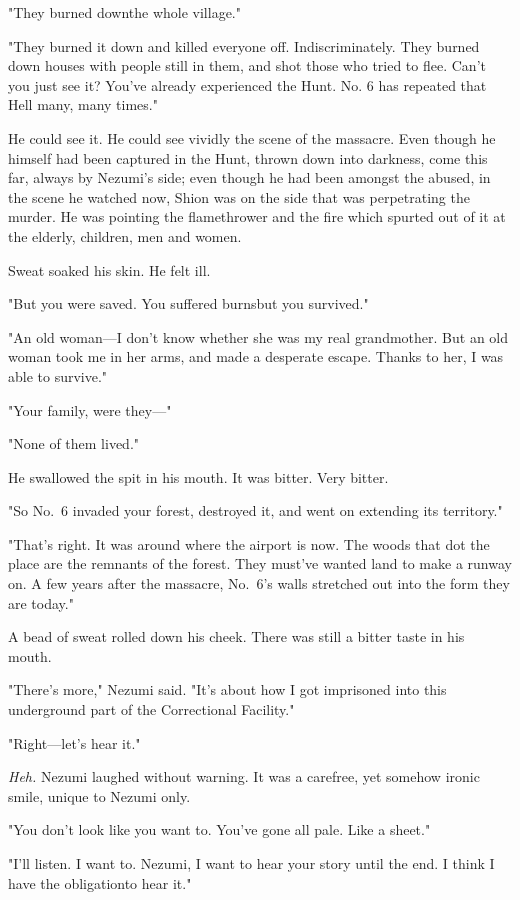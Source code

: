 "They burned down\el the whole village."

"They burned it down and killed everyone off. Indiscriminately. They
burned down houses with people still in them, and shot those who tried
to flee. Can't you just see it? You've already experienced the Hunt. No.
6 has repeated that Hell many, many times."

He could see it. He could see vividly the scene of the massacre. Even
though he himself had been captured in the Hunt, thrown down into
darkness, come this far, always by Nezumi's side; even though he had
been amongst the abused, in the scene he watched now, Shion was on the
side that was perpetrating the murder. He was pointing the flamethrower
and the fire which spurted out of it at the elderly, children, men and
women.

Sweat soaked his skin. He felt ill.

"But you were saved. You suffered burns\el but you survived."

"An old woman---I don't know whether she was my real grandmother. But an
old woman took me in her arms, and made a desperate escape. Thanks to
her, I was able to survive."

"Your family, were they---"

"None of them lived."

He swallowed the spit in his mouth. It was bitter. Very bitter.

"So No.~6 invaded your forest, destroyed it, and went on extending its
territory."

"That's right. It was around where the airport is now. The woods that
dot the place are the remnants of the forest. They must've wanted land
to make a runway on. A few years after the massacre, No.~6's walls
stretched out into the form they are today."

A bead of sweat rolled down his cheek. There was still a bitter taste in
his mouth.

"There's more," Nezumi said. "It's about how I got imprisoned into this
underground part of the Correctional Facility."

"Right---let's hear it."

\emph{Heh.} Nezumi laughed without warning. It was a carefree, yet somehow
ironic smile, unique to Nezumi only.

"You don't look like you want to. You've gone all pale. Like a sheet."

"I'll listen. I want to. Nezumi, I want to hear your story until the
end. I think I have the obligation\el to hear it."

